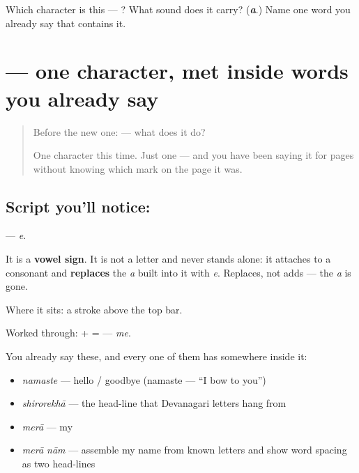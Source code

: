 \begin{tcolorbox}[breakable,colback=teal!4,colframe=teal!35!black,title={Before you move on}]
Which character is this — ? What sound does it carry? (\emph{\textbf{a}}.) Name one word you already say that contains it.
\end{tcolorbox}
\section[\texorpdfstring{\hi{े} (e)}{े (e)}]{ — one character, met inside words you already say}

\label{lesson:HI-S112-vowel-sign-e}



\begin{quote}
Before the new one:  — what does it do?

One character this time. Just one — and you have been saying it for pages without knowing which mark on the page it was.
\end{quote}

\subsection*{Script you'll notice: }
\textbf{} — \emph{e}.

It is a \textbf{vowel sign}. It is not a letter and never stands alone: it attaches to a consonant and \textbf{replaces} the \emph{a} built into it with \emph{e}. Replaces, not adds — the \emph{a} is gone.

Where it sits: a stroke above the top bar.

Worked through: \textbf{} + \textbf{} = \textbf{} — \emph{me}.

You already say these, and every one of them has  somewhere inside it:

\begin{itemize}
\raggedright
  \item \textbf{} \emph{namaste} — hello / goodbye (namaste — \textquotedblleft{}I bow to you\textquotedblright{})
  \item \textbf{} \emph{shirorekhā} — the head-line that Devanagari letters hang from
  \item \textbf{} \emph{merā} — my
  \item \textbf{ } \emph{merā nām} — assemble my name from known letters and show word spacing as two head-lines
\end{itemize}

